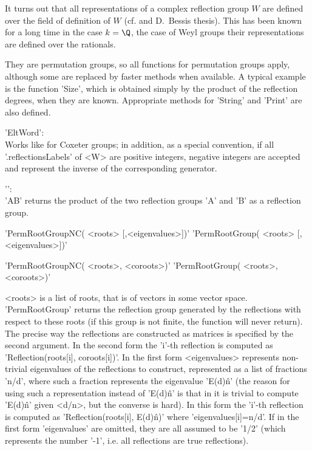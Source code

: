 It turns out that all representations of a complex reflection group $W$ are
defined over the field of definition of $W$ (cf. \cite{Ben76} and D.~Bessis
thesis).  This has been known for a long  time in the case $k=\Q$, the case
of Weyl groups\: their representations are defined over the rationals.



They are permutation groups, so all functions for permutation groups apply,
although  some are  replaced by  faster methods  when available.  A typical
example  is the function 'Size', which is obtained simply by the product of
the  reflection  degrees,  when  they  are  known.  Appropriate methods for
'String' and 'Print' are also defined.

'EltWord':\\  Works  like  for  Coxeter  groups;  in addition, as a special
convention,  if  all  '.reflectionsLabels'  of  <W>  are positive integers,
negative   integers  are  accepted   and  represent  the   inverse  of  the
corresponding generator.

'\*':\\  'A\*B' returns the product of the two reflection groups 'A' and 'B'
 as a reflection group.


'PermRootGroupNC( <roots> [,<eigenvalues>])'
'PermRootGroup( <roots> [,<eigenvalues>])'

'PermRootGroupNC( <roots>, <coroots>)'
'PermRootGroup( <roots>, <coroots>)'

<roots>  is  a  list  of  roots,  that  is of vectors in some vector space.
'PermRootGroup'  returns the reflection group  generated by the reflections
with respect to these roots (if this group is not finite, the function will
never  return). The precise way the reflections are constructed as matrices
is  specified  by  the  second  argument.  In  the  second  form the 'i'-th
reflection  is computed as 'Reflection(roots[i], coroots[i])'. In the first
form <eigenvalues> represents non-trivial eigenvalues of the reflections to
construct,  represented as a list of fractions 'n/d', where such a fraction
represents   the  eigenvalue  'E(d)\^n'  (the   reason  for  using  such  a
representation  instead of  'E(d)\^n' is  that in  {\GAP} it  is trivial to
compute  'E(d)\^n' given <d/n>, but the converse is hard). In this form the
'i'-th  reflection  is  computed  as  'Reflection(roots[i], E(d)\^n)' where
'eigenvalues[i]=n/d'.  If in the first form 'eigenvalues' are omitted, they
are  all assumed to  be '1/2' (which  represents the number  '-1', i.e. all
reflections are true reflections).

